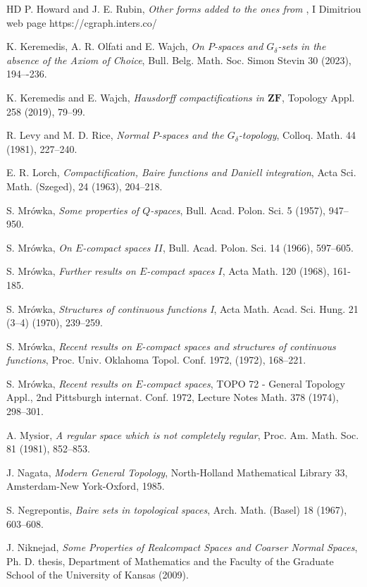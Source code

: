 \documentclass[12pt,twoside,leqno]{article}
\theoremstyle{plain}
\theoremstyle{definition}
\theoremstyle{remark}
\begin{document}
\begin{thebibliography}{HD}
 P. Howard and J. E. Rubin, {\it Other forms added to the ones from \cite{hr}}, I Dimitriou web page https://cgraph.inters.co/

 K. Keremedis, A. R. Olfati and E. Wajch, {\it On $P$-spaces and $G_{\delta}$-sets in the absence of the Axiom of Choice}, Bull. Belg. Math. Soc. Simon Stevin 30 (2023), 194–-236.

 K. Keremedis and E. Wajch, {\it Hausdorff compactifications in $\mathbf{ZF}$}, Topology Appl. 258 (2019), 79--99.

 R. Levy and M. D. Rice, {\it Normal $P$-spaces and the $G_{\delta}$-topology}, Colloq. Math. 44 (1981), 227--240.

 E. R. Lorch, {\it Compactification, Baire functions and Daniell integration}, Acta Sci. Math. (Szeged), 24 (1963), 204--218.

  S. Mr\'owka, {\it Some properties of $Q$-spaces}, Bull. Acad. Polon. Sci. 5 (1957), 947--950.

 S. Mr\'owka, {\it On $E$-compact spaces $II$}, Bull. Acad. Polon. Sci. 14 (1966), 597--605.

 S. Mr\'owka, {\it Further results on $E$-compact spaces $I$}, Acta Math. 120 (1968), 161-185.

 S. Mr\'owka, {\it Structures of continuous functions I}, Acta Math. Acad. Sci. Hung. 21 (3--4) (1970), 239--259.

 S. Mr\'owka, {\it Recent results on E-compact spaces and structures of continuous functions}, Proc. Univ. Oklahoma Topol. Conf. 1972, (1972), 168--221.

 S. Mr\'owka, {\it Recent results on $E$-compact spaces}, TOPO 72 - General Topology Appl., 2nd Pittsburgh internat. Conf. 1972, Lecture Notes Math. 378 (1974), 298--301.

 A. Mysior, {\it A regular space which is not completely regular}, Proc. Am. Math. Soc. 81 (1981), 852--853.

 J. Nagata, {\it Modern General Topology}, North-Holland Mathematical Library 33, Amster\-dam-New York-Oxford, 1985.

 S. Negrepontis, {\it Baire sets in topological spaces}, Arch. Math. (Basel) 18 (1967), 603--608.

 J. Niknejad, {\it Some Properties of Realcompact Spaces and Coarser Normal Spaces}, Ph. D. thesis, Department of Mathematics and the
Faculty of the Graduate School of the University of Kansas (2009).


\end{thebibliography}
\end{document}
